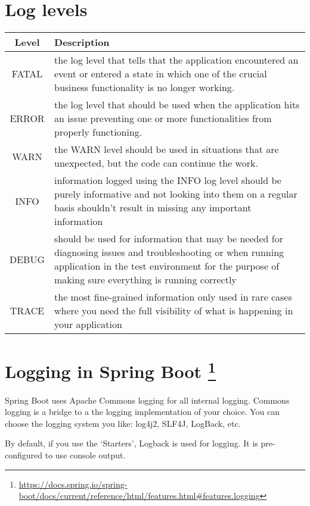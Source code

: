 \section{Log levels}

\begin{tabular}{|c|p{12cm}|}
\hline
Level & Description \\
\hline
FATAL & the log level that tells that the application encountered an event or entered a state in which one of the crucial business functionality is no longer working. \\

ERROR &  the log level that should be used when the application hits an issue preventing one or more functionalities from properly functioning.\\

WARN & the WARN level should be used in situations that are unexpected, but the code can continue the work. \\

INFO & information logged using the INFO log level should be purely informative and not looking into them on a regular basis shouldn’t result in missing any important information\\

DEBUG & should be used for information that may be needed for diagnosing issues and troubleshooting or when running application in the test environment for the purpose of making sure everything is running correctly \\

TRACE &  the most fine-grained information only used in rare cases where you need the full visibility of what is happening in your application \\
\hline
\end{tabular}

\section{Logging in Spring Boot \footnote{\url{https://docs.spring.io/spring-boot/docs/current/reference/html/features.html#features.logging}}}

Spring Boot uses Apache Commons logging for all internal logging. Commons logging is a bridge to a the logging implementation of your choice. You can choose the logging system you like: log4j2, SLF4J, LogBack, etc.

By default, if you use the `Starters', Logback is used for logging. It is pre-configured to use console output.


